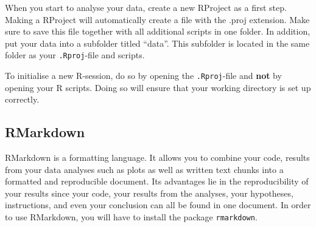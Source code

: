 \documentclass[
  letterpaper,
  DIV=11,
  numbers=noendperiod,
  oneside]{scrreprt}
\begin{document}
\begin{tcolorbox}[enhanced jigsaw, colframe=quarto-callout-tip-color-frame, bottomrule=.15mm, left=2mm, arc=.35mm, toprule=.15mm, opacityback=0, colback=white, rightrule=.15mm, breakable, leftrule=.75mm]
\begin{minipage}[t]{5.5mm}
\textcolor{quarto-callout-tip-color}{\faLightbulb}
\end{minipage}%
\begin{minipage}[t]{\textwidth - 5.5mm}

When you start to analyse your data, create a new RProject as a first
step. Making a RProject will automatically create a file with the .proj
extension. Make sure to save this file together with all additional
scripts in one folder. In addition, put your data into a subfolder
titled ``data''. This subfolder is located in the same folder as your
\texttt{.Rproj}-file and scripts.

\end{minipage}%
\end{tcolorbox}

\begin{tcolorbox}[enhanced jigsaw, colframe=quarto-callout-caution-color-frame, bottomrule=.15mm, left=2mm, arc=.35mm, toprule=.15mm, opacityback=0, colback=white, rightrule=.15mm, breakable, leftrule=.75mm]
\begin{minipage}[t]{5.5mm}
\textcolor{quarto-callout-caution-color}{\faFire}
\end{minipage}%
\begin{minipage}[t]{\textwidth - 5.5mm}

To initialise a new R-session, do so by opening the \texttt{.Rproj}-file
and \textbf{not} by opening your R scripts. Doing so will ensure that
your working directory is set up correctly.

\end{minipage}%
\end{tcolorbox}

\hypertarget{rmarkdown}{%
\subsection{RMarkdown}\label{rmarkdown}}

RMarkdown is a formatting language. It allows you to combine your code,
results from your data analyses such as plots as well as written text
chunks into a formatted and reproducible document. Its advantages lie in
the reproducibility of your results since your code, your results from
the analyses, your hypotheses, instructions, and even your conclusion
can all be found in one document. In order to use RMarkdown, you will
have to install the package \texttt{rmarkdown}.
\end{document}
